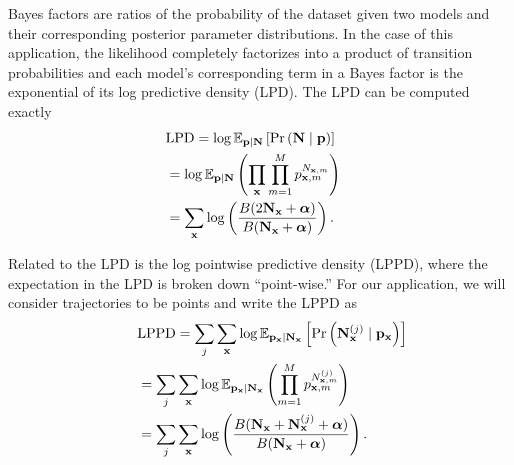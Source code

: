 \documentclass[prl,twocolumn,groupedaddress]{revtex4-1}
\newcommand{\bN}{\mathbf{N}}
\newcommand{\bx}{\mathbf{x}}
\newcommand{\bp}{\mathbf{p}}
\newcommand{\balpha}{{\boldsymbol\alpha}}
\begin{document}
Bayes factors are ratios of the probability of the dataset given two models and their corresponding posterior parameter distributions. In the case of this application, the likelihood completely factorizes into  a product of transition probabilities and each model's corresponding term in a Bayes factor is the exponential of its log predictive density (LPD). The LPD can be computed exactly
\begin{align}
\lefteqn{\textrm{LPD} = \log\mathbb{E}_{\bp\vert\bN}  \left[     \Pr\left(\mathbf{N}  \mid \bp \right) \right] } \nonumber\\
&=  \log \mathbb{E}_{\bp\vert\bN} \left( \prod_\bx  \prod_{m=1}^{M} p_{\bx,m}^{N_{\bx,m}} \right) \nonumber \\
&= \sum_{\bx} \log\left( \frac{B(2\bN_\bx+\balpha)}{B(\bN_\bx +\balpha )} \right).
\end{align}

Related to the LPD is the log pointwise predictive density (LPPD), where the expectation in
the LPD is broken down ``point-wise.'' For our application, we will consider trajectories to be
points and write the LPPD as
\begin{align}
\lefteqn{\textrm{LPPD} = \sum_j\sum_{\bx}\log\mathbb{E}_{\bp_\bx\vert\bN_\bx}  \left[     \Pr\left(\mathbf{N}^{(j)}_{\bx} \mid \bp_\bx \right) \right] } \nonumber\\
&= \sum_j\sum_{\mathbf{x}} \log \mathbb{E}_{\bp_\bx\vert\bN_\bx} \left(%
 \prod_{m=1}^{M} p_{\bx,m}^{N^{(j)}_{\bx,m}} \right) \nonumber\\
&=\sum_j \sum_{\bx}  \log\left(  \frac{B(\bN_\bx +\bN_{\bx}^{(j)} +\balpha)}{B(\bN_\bx +\balpha)} \right).
\end{align}
\end{document}
